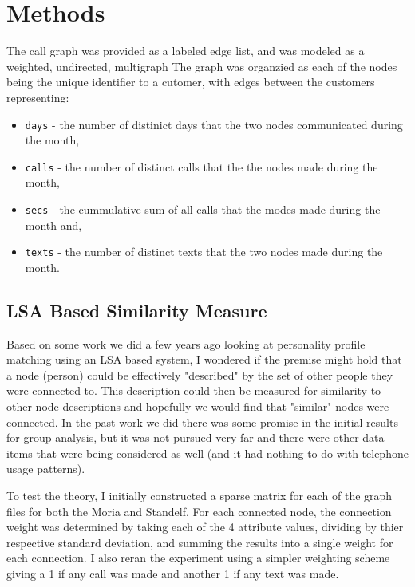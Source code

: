 \section{Methods}
\label{sec:Methods}

The call graph was provided as a labeled edge list, and was modeled as a weighted, undirected, multigraph 
The graph was organzied as each of the nodes being the unique identifier to a cutomer, with edges between the customers representing:
\begin{itemize}
	\item \texttt{days} - the number of distinict days that the two nodes communicated during the month,
	\item \texttt{calls} - the number of distinct calls that the the nodes made during the month,
	\item \texttt{secs} - the cummulative sum of all calls that the modes made during the month and,
	\item \texttt{texts} - the number of distinct texts that the two nodes made during the month.
\end{itemize}

\subsection{LSA Based Similarity Measure}
Based on some work we did a few years ago looking at personality profile
matching using an LSA based system, I wondered if the premise might hold that
a node (person) could be effectively "described" by the set of other people
they were connected to.  This description could then be measured for
similarity to other node descriptions and hopefully we would find that
"similar" nodes were connected. In the past work we did there was some promise
in the initial results for group analysis, but it was not pursued very far and
there were other data items that were being considered as well (and it had
nothing to do with telephone usage patterns).

To test the theory, I initially constructed a sparse matrix for each of the
graph files for both the Moria and Standelf.  For each connected node, the
connection weight was determined by taking each of the 4 attribute values,
dividing by thier respective standard deviation, and summing the results into
a single weight for each connection. I also reran the experiment using a
simpler weighting scheme giving a 1 if any call was made and another 1 if any
text was made.

